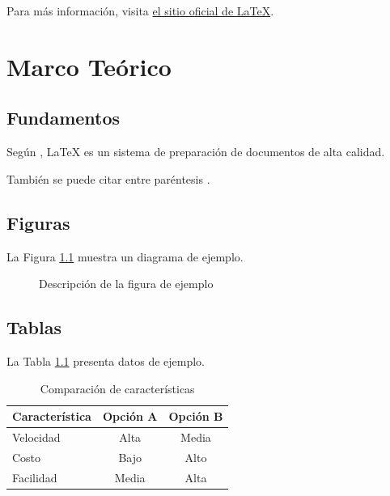\documentclass[12pt, a4paper]{report}
\begin{document}
Para más información, visita \href{https://www.latex-project.org/}{el sitio oficial de LaTeX}.

\chapter{Marco Teórico}
\label{cap:marco}

\section{Fundamentos}
Según \textcite{lamport1994}, \LaTeX{} es un sistema de preparación de documentos de alta calidad.

También se puede citar entre paréntesis \parencite{knuth1984}.

\section{Figuras}
La Figura \ref{fig:ejemplo} muestra un diagrama de ejemplo.

\begin{figure}[htbp]
    \centering
    \caption{Descripción de la figura de ejemplo}
    \label{fig:ejemplo}
\end{figure}

\section{Tablas}
La Tabla \ref{tab:ejemplo} presenta datos de ejemplo.

\begin{table}[htbp]
    \centering
    \caption{Comparación de características}
    \label{tab:ejemplo}
    \begin{tabular}{lcc}
        \toprule
        \textbf{Característica} & \textbf{Opción A} & \textbf{Opción B} \\
        \midrule
        Velocidad & Alta & Media \\
        Costo & Bajo & Alto \\
        Facilidad & Media & Alta \\
        \bottomrule
    \end{tabular}
\end{table}
\end{document}
